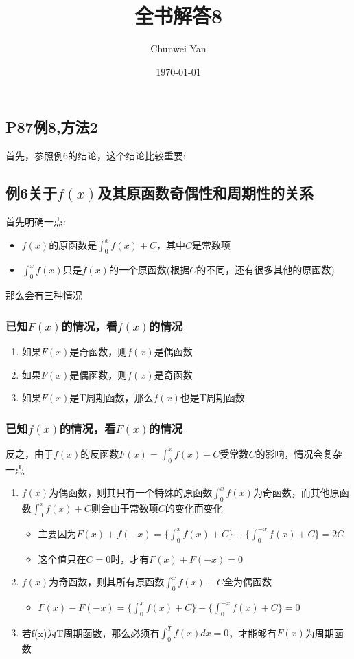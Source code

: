 \documentclass[a4paper]{ctexart}
\title{全书解答8}
\author{Chunwei Yan}
\date{\today}
\begin{document}
\maketitle
\begin{multicols}{2}
\section{P87例8,方法2}
\par 首先，参照例6的结论，这个结论比较重要:

\subsection{例6关于$f(x)$及其原函数奇偶性和周期性的关系}
\par 首先明确一点: 
\begin{itemize}
    \item $f(x)$的原函数是$\int_0^x{f(x)} + C$，其中$C$是常数项
    \item $\int_0^x{f(x)}$只是$f(x)$的一个原函数(根据$C$的不同，还有很多其他的原函数)
\end{itemize}
\par 那么会有三种情况

\subsubsection{ 已知$F(x)$的情况，看$f(x)$的情况}
\begin{enumerate}
\item 如果$F(x)$是奇函数，则$f(x)$是偶函数
\item 如果$F(x)$是偶函数，则$f(x)$是奇函数
\item 如果$F(x)$是T周期函数，那么$f(x)$也是T周期函数
\end{enumerate}

\subsubsection{ 已知$f(x)$的情况，看$F(x)$的情况}
\par 反之，由于$f(x)$的反函数$F(x) = \int_0^x{f(x)} + C$受常数$C$的影响，情况会复杂一点
\begin{enumerate}
\item $f(x)$为偶函数，则其只有一个特殊的原函数$\int_0^x{f(x)}$为奇函数，而其他原函数$\int_0^x{f(x)}+C$则会由于常数项$C$的变化而变化
    \begin{itemize}
    \item 主要因为$F(x)+f(-x) = \{\int_0^x{f(x)} + C \} + \{\int_0^{-x}{f(x)} + C\} = 2C$
    \item 这个值只在$C=0$时，才有$F(x)+F(-x)=0$
    \end{itemize}
\item $f(x)$为奇函数，则其所有原函数$\int_0^x{f(x)}+C$全为偶函数
    \begin{itemize}
    \item $F(x) - F(-x) = \{ \int_{0}^{x}{f(x)} + C \} - \{ \int_{0}^{-x}{f(x)} + C \} = 0$
    \end{itemize}
\item 若f(x)为T周期函数，那么必须有$\int_0^T{f(x)dx}=0$，才能够有$F(x)$为周期函数
\end{enumerate}


\end{multicols}
\end{document}
